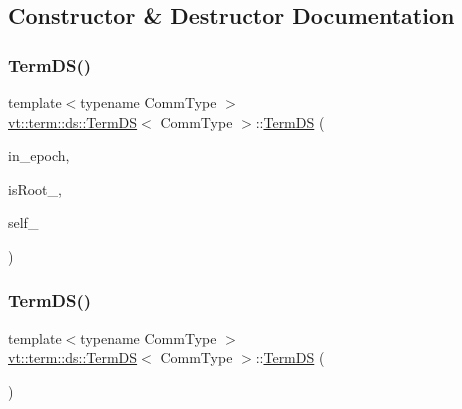 \subsection{Constructor \& Destructor Documentation}
\mbox{\label{structvt_1_1term_1_1ds_1_1_term_d_s_a1873de7f6d3009bd997c64eefb46d9b5}} 
\subsubsection{\texorpdfstring{Term\+D\+S()}{TermDS()}\hspace{0.1cm}{\footnotesize\ttfamily [1/3]}}
{\footnotesize\ttfamily template$<$typename Comm\+Type $>$ \\
\hyperlink{structvt_1_1term_1_1ds_1_1_term_d_s}{vt\+::term\+::ds\+::\+Term\+DS}$<$ Comm\+Type $>$\+::\hyperlink{structvt_1_1term_1_1ds_1_1_term_d_s}{Term\+DS} (\begin{DoxyParamCaption}\item[{\hyperlink{namespacevt_a81d11b28122d43bf9834577e4a06440f}{Epoch\+Type}}]{in\+\_\+epoch,  }\item[{bool}]{is\+Root\+\_\+,  }\item[{\hyperlink{namespacevt_a866da9d0efc19c0a1ce79e9e492f47e2}{Node\+Type}}]{self\+\_\+ }\end{DoxyParamCaption})}

\mbox{\label{structvt_1_1term_1_1ds_1_1_term_d_s_a01ffd2a7fc4410599708c3fcb5998743}} 
\subsubsection{\texorpdfstring{Term\+D\+S()}{TermDS()}\hspace{0.1cm}{\footnotesize\ttfamily [2/3]}}
{\footnotesize\ttfamily template$<$typename Comm\+Type $>$ \\
\hyperlink{structvt_1_1term_1_1ds_1_1_term_d_s}{vt\+::term\+::ds\+::\+Term\+DS}$<$ Comm\+Type $>$\+::\hyperlink{structvt_1_1term_1_1ds_1_1_term_d_s}{Term\+DS} (\begin{DoxyParamCaption}\item[{\hyperlink{structvt_1_1term_1_1ds_1_1_term_d_s}{Term\+DS}$<$ Comm\+Type $>$ \&\&}]{ }\end{DoxyParamCaption})\hspace{0.3cm}{\ttfamily [default]}}

